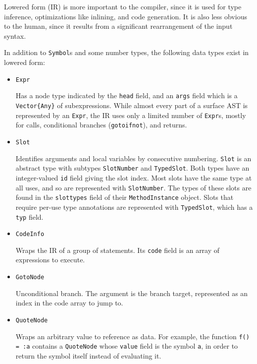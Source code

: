 Lowered form (IR) is more important to the compiler, since it is used for type inference, optimizations like inlining, and code generation. It is also less obvious to the human, since it results from a significant rearrangement of the input syntax.



In addition to \texttt{Symbol}s and some number types, the following data types exist in lowered form:



\begin{itemize}
\item \texttt{Expr}

Has a node type indicated by the \texttt{head} field, and an \texttt{args} field which is a \texttt{Vector\{Any\}} of subexpressions. While almost every part of a surface AST is represented by an \texttt{Expr}, the IR uses only a limited number of \texttt{Expr}s, mostly for calls, conditional branches (\texttt{gotoifnot}), and returns.


\item \texttt{Slot}

Identifies arguments and local variables by consecutive numbering. \texttt{Slot} is an abstract type with subtypes \texttt{SlotNumber} and \texttt{TypedSlot}. Both types have an integer-valued \texttt{id} field giving the slot index. Most slots have the same type at all uses, and so are represented with \texttt{SlotNumber}. The types of these slots are found in the \texttt{slottypes} field of their \texttt{MethodInstance} object. Slots that require per-use type annotations are represented with \texttt{TypedSlot}, which has a \texttt{typ} field.


\item \texttt{CodeInfo}

Wraps the IR of a group of statements. Its \texttt{code} field is an array of expressions to execute.


\item \texttt{GotoNode}

Unconditional branch. The argument is the branch target, represented as an index in the code array to jump to.


\item \texttt{QuoteNode}

Wraps an arbitrary value to reference as data. For example, the function \texttt{f() = :a} contains a \texttt{QuoteNode} whose \texttt{value} field is the symbol \texttt{a}, in order to return the symbol itself instead of evaluating it.



\end{itemize}
